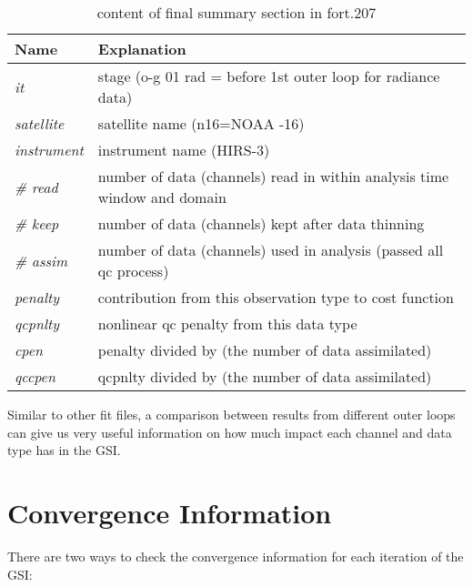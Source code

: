 \begin{itemize}[leftmargin=*]
\begin{table}[htbp]
\centering
\caption{content of final summary section in fort.207}
\begin{tabular}{|p{2.0cm}|p{10cm}|}
\hline
\hline
 Name & Explanation \\
\hline
\hline
\textit{it} & stage (o-g 01 rad = before 1st outer loop for radiance data) \\
\hline
\textit{satellite} & satellite name (n16=NOAA -16) \\
\hline
\textit{instrument} & instrument name (HIRS-3) \\
\hline
\textit{\# read} & number of data (channels) read in within analysis time window and domain\\
\hline
\textit{\# keep} & number of data (channels) kept after data thinning \\
\hline
\textit{\# assim} & number of data (channels) used in analysis (passed all qc process) \\
\hline
\textit{penalty} & contribution from this observation type to cost function  \\
\hline
\textit{qcpnlty} & nonlinear qc penalty from this data type \\
\hline
\textit{cpen} & penalty divided by (the number of data assimilated)  \\
\hline
\textit{qccpen} & qcpnlty divided by (the number of data assimilated)\\
\hline
\end{tabular}
\label{tab49}
\end{table} 



Similar to other fit files, a comparison between results from different outer loops can give us very useful information on how much impact each channel and data type has in the GSI.

\end{itemize}

\section{Convergence Information}
\label{sec4.6}

There are two ways to check the convergence information for each iteration of the GSI:

